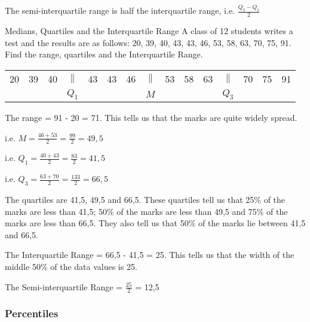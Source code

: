 \documentclass[10pt,a4paper,titlepage,twoside,openright]{report}
\begin{document}
The semi-interquartile range is half the interquartile range, i.e. $\frac{Q_3 - Q_1}{2}$

\begin{wex}{Medians, Quartiles and the Interquartile Range}
{A class of 12 students writes a test and the results are as follows: 20, 39, 40, 43, 43, 46, 53, 58, 63, 70, 75, 91. Find the range, quartiles and the Interquartile Range.}

\westep{}
\begin{center}
\begin{tabular}{c c c c c c c c c c c c c c c}
20 & 39 & 40 & $\|$ & 43 & 43 & 46 & $\|$ & 53 & 58 & 63 & $\|$ & 70 & 75 & 91\\
 & & & $Q_1$ & & & & $M$ & & & & $Q_3$ & & & \\
\end{tabular}
\end{center}

The range = 91 - 20 = 71. This tells us that the marks are quite widely spread.

i.e. $M = \frac{46 + 53}{2} = \frac{99}{2} = 49,5$

i.e. $Q_1 = \frac{40 + 43}{2} = \frac{83}{2} = 41,5$

i.e. $Q_3 = \frac{63 + 70}{2} = \frac{133}{2} = 66,5$

The quartiles are 41,5, 49,5 and 66,5. These quartiles tell us that 25$\%$ of the marks are less than 41,5; 50$\%$ of the marks are less than 49,5 and 75$\%$ of the marks are less than 66,5. They also tell us that 50$\%$ of the marks lie between 41,5 and 66,5.

The Interquartile Range = 66,5 - 41,5 = 25. This tells us that the width of the middle 50$\%$ of the data values is 25.

The Semi-interquartile Range = $\frac{25}{2}$ = 12,5

\end{wex}

\subsubsection{Percentiles}
\end{document}
